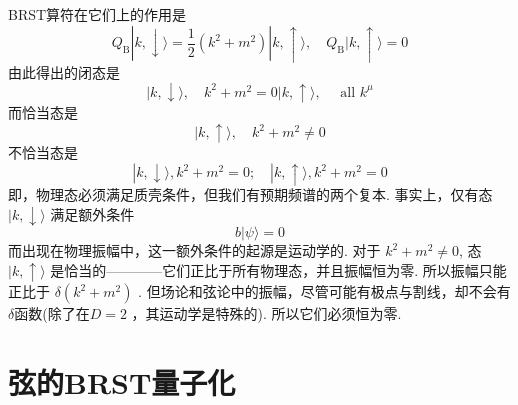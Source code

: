 BRST算符在它们上的作用是
\begin{equation}
Q_{\mathrm{B}}|k, \downarrow\rangle=\frac{1}{2}\left(k^{2}+m^{2}\right)|k, \uparrow\rangle, \quad Q_{\mathrm{B}}|k, \uparrow\rangle=0
\end{equation}
由此得出的闭态是
\begin{subequations}
\begin{equation}
|k, \downarrow\rangle, \quad k^{2}+m^{2}=0
\end{equation}
\begin{equation}
|k, \uparrow\rangle, \quad \text { all } k^{\mu}
\end{equation}
\end{subequations}
而恰当态是
\begin{equation}
|k, \uparrow\rangle, \quad k^{2}+m^{2} \neq 0
\end{equation}
不恰当态是
\begin{equation}
|k, \downarrow\rangle, k^{2}+m^{2}=0 ; \quad|k, \uparrow\rangle, k^{2}+m^{2}=0
\end{equation}
即，物理态必须满足质壳条件，但我们有预期频谱的两个复本. 事实上，仅有态$|k, \downarrow\rangle$ 满足额外条件
\begin{equation}
b|\psi\rangle=0
\end{equation}
而出现在物理振幅中，这一额外条件的起源是运动学的. 对于 $k^{2}+m^{2} \neq 0$, 态 $|k, \uparrow\rangle$ 是恰当的————它们正比于所有物理态，并且振幅恒为零. 所以振幅只能正比于 $\delta\left(k^{2}+m^{2}\right) $ . 但场论和弦论中的振幅，尽管可能有极点与割线，却不会有$\delta$函数(除了在$D=2$ ，其运动学是特殊的). 所以它们必须恒为零.\\

\section{弦的BRST量子化}%

